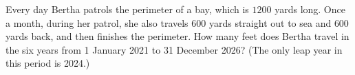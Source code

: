 Every day Bertha patrols the perimeter of a bay, which is $1200$ yards long. Once a month, during her patrol, she also travels $600$ yards straight out to sea and $600$ yards back, and then finishes the perimeter. How many feet does Bertha travel in the six years from 1 January 2021 to 31 December 2026? (The only leap year in this period is 2024.)
